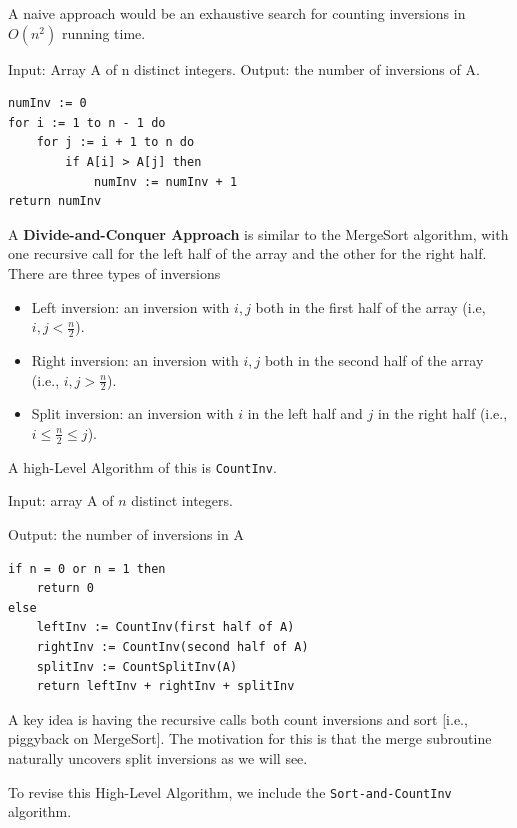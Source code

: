 \documentclass[11pt]{article}
\begin{document}
A naive approach would be an exhaustive search for counting inversions in $O(n^2)$ running time.

Input: Array A of n distinct integers.
Output: the number of inversions of A.

\vspace{11pt}
\begin{lstlisting}
numInv := 0
for i := 1 to n - 1 do
    for j := i + 1 to n do
        if A[i] > A[j] then
            numInv := numInv + 1
return numInv
\end{lstlisting}
\vspace{11pt}

A \textbf{Divide-and-Conquer Approach} is similar to the MergeSort algorithm, with one recursive call for the left half of the array and the other for the right half. There are three types of inversions
\begin{itemize}
    \item Left inversion: an inversion with $i,j$ both in the first half of the array (i.e, $i,j < \frac{n}{2}$).
    \item Right inversion: an inversion with $i,j$ both in the second half of the array (i.e., $i,j > \frac{n}{2}$).
    \item Split inversion: an inversion with $i$ in the left half and $j$ in the right half (i.e., $i \leq \frac{n}{2} \leq j$).
\end{itemize}
\vspace{11pt}

A high-Level Algorithm of this is \texttt{CountInv}.

Input: array A of $n$ distinct integers.

Output: the number of inversions in A

\vspace{11pt}
\begin{lstlisting}
if n = 0 or n = 1 then
    return 0
else
    leftInv := CountInv(first half of A)
    rightInv := CountInv(second half of A)
    splitInv := CountSplitInv(A)
    return leftInv + rightInv + splitInv
\end{lstlisting}
\vspace{11pt}

A key idea is having the recursive calls both count inversions and sort [i.e., piggyback on MergeSort]. The motivation for this is that the merge subroutine naturally uncovers split inversions as we will see.

To revise this High-Level Algorithm, we include the \texttt{Sort-and-CountInv} algorithm.
\end{document}
